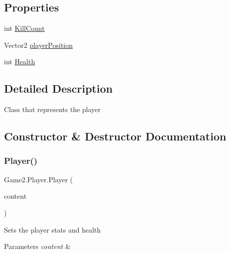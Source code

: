 \subsection*{Properties}
\begin{DoxyCompactItemize}
\item 
int \mbox{\hyperlink{class_game2_1_1_player_a0de12ae1963fa77b943c0da0c41d9a38}{Kill\+Count}}
\item 
Vector2 \mbox{\hyperlink{class_game2_1_1_player_a03cfdc80acd38082853948af2f299824}{player\+Position}}
\item 
int \mbox{\hyperlink{class_game2_1_1_player_a0f289bb7a69b375f4c0bb7bf5ab87430}{Health}}
\end{DoxyCompactItemize}


\subsection{Detailed Description}
Class that represents the player 



\subsection{Constructor \& Destructor Documentation}
\mbox{\label{class_game2_1_1_player_aba2289750066d1fbf0cf9ba5aabf7027}} 
\subsubsection{\texorpdfstring{Player()}{Player()}}
{\footnotesize\ttfamily Game2.\+Player.\+Player (\begin{DoxyParamCaption}\item[{Content\+Manager}]{content }\end{DoxyParamCaption})}



Sets the player stats and health 


\begin{DoxyParams}{Parameters}
{\em content} & \\
\hline
\end{DoxyParams}


